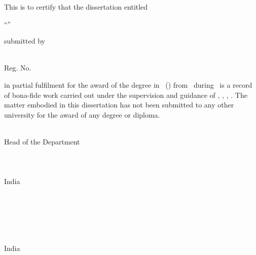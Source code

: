 \begin{certificate}
This is to certify that the  dissertation entitled
\begin{center}
``{\large \textsc{\textbf{\thesistitle}}}''

submitted by

\textbf{\large \studentname}\\
\baselineskip=18pt  Reg. No. \regno
\end{center}
     \noindent in partial fulfilment for the award of the degree in \degree\, (\coursename) from \institute\, during \courseduration\, is a record of bona-fide work carried out under the supervision and guidance of \guidename, \guidedesignation, \department, \institute. The matter embodied in this dissertation has not been submitted to any other university for the award of any degree or diploma.

\vspace*{2cm}
\noindent

\begin{minipage}[t]{0.45\textwidth}
	\baselineskip=18pt
	\centering
    \noindent {\bf \hodname }\\
    Head of the Department\\
    \department\\
    \institute\\ 
    \university\\
     India
\end{minipage}
\hspace*{.1\textwidth}
 \begin{minipage}[t]{0.45\textwidth}
 	\baselineskip=18pt
 	\centering
 \noindent {\bf \guidename}\\
    \guidedesignation\\
    \department\\
    \institute\\
     \university\\
      India
\end{minipage}
\end{certificate} 
